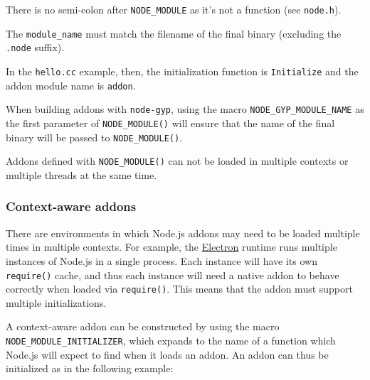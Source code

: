 There is no semi-colon after \texttt{NODE\_MODULE} as it's not a
function (see \texttt{node.h}).

The \texttt{module\_name} must match the filename of the final binary
(excluding the \texttt{.node} suffix).

In the \texttt{hello.cc} example, then, the initialization function is
\texttt{Initialize} and the addon module name is \texttt{addon}.

When building addons with \texttt{node-gyp}, using the macro
\texttt{NODE\_GYP\_MODULE\_NAME} as the first parameter of
\texttt{NODE\_MODULE()} will ensure that the name of the final binary
will be passed to \texttt{NODE\_MODULE()}.

Addons defined with \texttt{NODE\_MODULE()} can not be loaded in
multiple contexts or multiple threads at the same time.

\subsubsection{Context-aware addons}\label{context-aware-addons}

There are environments in which Node.js addons may need to be loaded
multiple times in multiple contexts. For example, the
\href{https://electronjs.org/}{Electron} runtime runs multiple instances
of Node.js in a single process. Each instance will have its own
\texttt{require()} cache, and thus each instance will need a native
addon to behave correctly when loaded via \texttt{require()}. This means
that the addon must support multiple initializations.

A context-aware addon can be constructed by using the macro
\texttt{NODE\_MODULE\_INITIALIZER}, which expands to the name of a
function which Node.js will expect to find when it loads an addon. An
addon can thus be initialized as in the following example:

\begin{Shaded}
\begin{Highlighting}[]
 \OperatorTok{;}

 
\OperatorTok{(}\OperatorTok{\textless{}}\OperatorTok{\textgreater{}}\OperatorTok{,}
\OperatorTok{\textless{}}\OperatorTok{\textgreater{}} \OperatorTok{,}
\OperatorTok{\textless{}}\OperatorTok{\textgreater{}}\OperatorTok{)} \OperatorTok{\{}
\OperatorTok{\}}
\end{Highlighting}
\end{Shaded}

